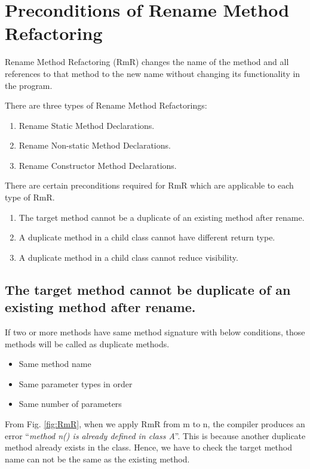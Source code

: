 \section{\textbf{Preconditions of Rename Method Refactoring}}

Rename Method Refactoring (RmR) changes the name of the method and all references to that method to the new name without changing its functionality in the program.

There are three types of Rename Method Refactorings:
\begin{enumerate}
\item Rename Static Method Declarations.
\item Rename Non-static Method Declarations.
\item Rename Constructor Method Declarations.
\end{enumerate}

There are certain preconditions required for RmR which are applicable to each type of RmR.
\begin{enumerate}
	\item The target method cannot be a duplicate of an existing method after rename.
	\item A duplicate method in a child class cannot have different return type.
	\item A duplicate method in a child class cannot reduce visibility.
\end{enumerate}

\subsection {The target method cannot be duplicate of an existing method after rename. }

If two or more methods have same method signature with
below conditions, those methods will be called as duplicate
methods.
\begin{itemize}
	\item Same method name
	\item Same parameter types in order
	\item Same number of parameters
\end{itemize}

From Fig. \ref{fig:RmR}, when we apply RmR from m to n, the compiler produces an error ``\textsl{method n() is already defined in class A}''. This is because another duplicate method already exists in the class. Hence, we have to check the target method name can not be the same as the existing method.


